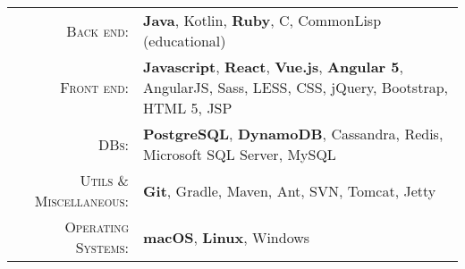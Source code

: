 %
%
%

\renewcommand{\arraystretch}{1.1}

	\begin{tabular}{>{}r>{}p{13cm}}
		\textsc{Back end:} &
			\textbf{Java}, Kotlin, \textbf{Ruby}, C, CommonLisp (educational) \\
		\textsc{Front end:} &
			\textbf{Javascript}, \textbf{React}, \textbf{Vue.js}, \textbf{Angular 5}, AngularJS, Sass, LESS, CSS, jQuery, Bootstrap, HTML 5, JSP \\
		\textsc{DBs:} &
			\textbf{PostgreSQL}, \textbf{DynamoDB}, Cassandra, Redis, Microsoft SQL Server, MySQL \\
		\textsc{Utils \& Miscellaneous:} &
			\textbf{Git}, Gradle, Maven, Ant, SVN, Tomcat, Jetty \\
		\textsc{Operating Systems:} &
			\textbf{macOS}, \textbf{Linux}, Windows \\
	\end{tabular}

